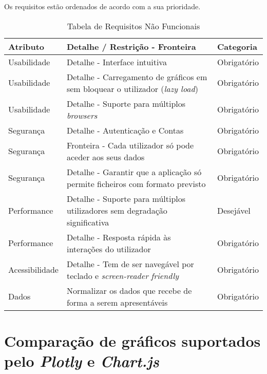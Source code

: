 Os requisitos estão ordenados de acordo com a sua prioridade.
\begin{table}[H]
    \centering
    \begin{tabular}{|l|p{7cm}|l|}
    \hline
    \textbf{Atributo} & \textbf{Detalhe / Restrição - Fronteira} & \textbf{Categoria} \\
    \hline
    Usabilidade & Detalhe - Interface intuitiva & Obrigatório \\
    Usabilidade & Detalhe - Carregamento de gráficos em sem bloquear o utilizador (\textit{lazy load}) & Obrigatório \\
    Usabilidade & Detalhe - Suporte para múltiplos \textit{browsers} & Obrigatório \\
    Segurança & Detalhe - Autenticação e Contas & Obrigatório \\
    Segurança & Fronteira - Cada utilizador só pode aceder aos seus dados & Obrigatório \\
    Segurança & Detalhe - Garantir que a aplicação só permite ficheiros com formato previsto & Obrigatório \\
    Performance & Detalhe - Suporte para múltiplos utilizadores sem degradação significativa & Desejável \\
    Performance & Detalhe - Resposta rápida às interações do utilizador & Obrigatório \\
    Acessibilidade & Detalhe - Tem de ser navegável por teclado e \textit{screen-reader} \textit{friendly} & Obrigatório \\
    Dados & Normalizar os dados que recebe de forma a serem apresentáveis & Obrigatório \\

    \hline
    \end{tabular}
    \caption{Tabela de Requisitos Não Funcionais}
    \label{tab:requisitosNaofuncionais}
    \end{table}

\chapter{Comparação de gráficos suportados pelo \textit{Plotly} e \textit{Chart.js}}
\label{ch:charts}

